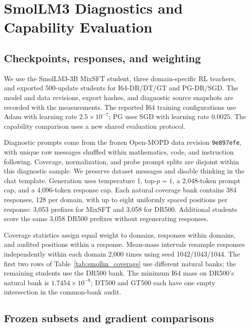 \section{SmolLM3 Diagnostics and Capability Evaluation}
\label{app:smollm_diagnostics}

\subsection{Checkpoints, responses, and weighting}

We use the SmolLM3-3B MixSFT student, three domain-specific RL teachers, and exported 500-update students for I64-DR/DT/GT and PG-DR/SGD. The model and data revisions, export hashes, and diagnostic source snapshots are recorded with the measurements. The reported I64 training configurations use Adam with learning rate $2.5\times10^{-7}$; PG uses SGD with learning rate $0.0025$. The capability comparison uses a new shared evaluation protocol.

Diagnostic prompts come from the frozen Open-MOPD data revision \texttt{9e897efe}, with unique raw messages shuffled within mathematics, code, and instruction following. Coverage, normalization, and probe prompt splits are disjoint within this diagnostic sample. We preserve dataset messages and disable thinking in the chat template. Generation uses temperature 1, top-$p=1$, a 2,048-token prompt cap, and a 4,096-token response cap. Each natural coverage bank contains 384 responses, 128 per domain, with up to eight uniformly spaced positions per response: 3,053 prefixes for MixSFT and 3,058 for DR500. Additional students score the same 3,058 DR500 prefixes without regenerating responses.

Coverage statistics assign equal weight to domains, responses within domains, and audited positions within a response. Mean-mass intervals resample responses independently within each domain 2,000 times using seed 1042/1043/1044. The first two rows of Table~\ref{tab:smollm_coverage} use different natural banks; the remaining students use the DR500 bank. The minimum I64 mass on DR500's natural bank is $1.7454\times10^{-8}$; DT500 and GT500 each have one empty intersection in the common-bank audit.



\subsection{Frozen subsets and gradient comparisons}

